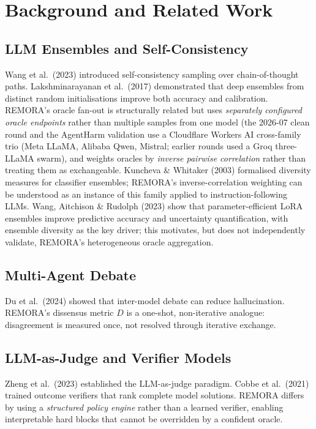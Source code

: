 \documentclass[10pt,twocolumn]{article}
\begin{document}
\section{Background and Related Work}
\label{sec:related}

\subsection{LLM Ensembles and Self-Consistency}
Wang et al.\ (2023) \cite{wang2023self} introduced self-consistency
sampling over chain-of-thought paths. Lakshminarayanan et al.\ (2017)
\cite{lakshminarayanan2017simple} demonstrated that deep ensembles from
distinct random initialisations improve both accuracy and calibration.
REMORA's oracle fan-out is structurally related but uses
\emph{separately configured oracle endpoints} rather than multiple samples
from one model (the 2026-07 clean round and the AgentHarm validation use a
Cloudflare Workers AI cross-family trio (Meta LLaMA, Alibaba Qwen,
Mistral; earlier rounds used a Groq three-LLaMA swarm),
and weights oracles by \emph{inverse pairwise correlation} rather than
treating them as exchangeable. Kuncheva \& Whitaker (2003)
\cite{kuncheva2003measures} formalised diversity measures for classifier
ensembles; REMORA's inverse-correlation weighting can be understood as an
instance of this family applied to instruction-following LLMs.
Wang, Aitchison \& Rudolph (2023) \cite{wang2023lora} show that
parameter-efficient LoRA ensembles improve predictive accuracy and
uncertainty quantification, with ensemble diversity as the key driver;
this motivates, but does not independently validate, REMORA's
heterogeneous oracle aggregation.

\subsection{Multi-Agent Debate}
Du et al.\ (2024) \cite{du2023improving} showed that inter-model
debate can reduce hallucination. REMORA's dissensus metric $D$ is a
one-shot, non-iterative analogue: disagreement is measured once, not
resolved through iterative exchange.

\subsection{LLM-as-Judge and Verifier Models}
Zheng et al.\ (2023) \cite{zheng2023judging} established the
LLM-as-judge paradigm. Cobbe et al.\ (2021) \cite{cobbe2021training}
trained outcome verifiers that rank complete model solutions. REMORA differs by using a \emph{structured policy engine} rather than a
learned verifier, enabling interpretable hard blocks that cannot be
overridden by a confident oracle.
\end{document}

